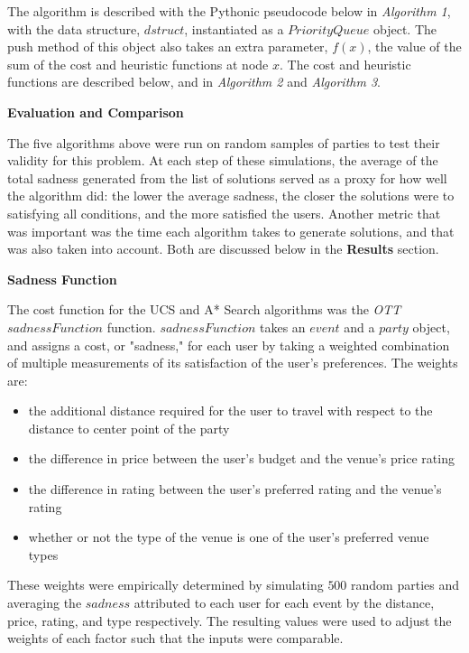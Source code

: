 \documentclass[11pt]{article}
\begin{document}
The algorithm is described with the Pythonic pseudocode below in \emph{Algorithm 1}, with the data structure, $dstruct$, instantiated as a $PriorityQueue$ object. The push method of this object also takes an extra parameter, $f(x)$, the value of the sum of the cost and heuristic functions at node $x$. The cost and heuristic functions are described below, and in \emph{Algorithm 2} and \emph{Algorithm 3}.

\medskip

\textbf{Evaluation and Comparison}

The five algorithms above were run on random samples of parties to test their validity for this problem. At each step of these simulations, the average of the total sadness generated from the list of solutions served as a proxy for how well the algorithm did: the lower the average sadness, the closer the solutions were to satisfying all conditions, and the more satisfied the users. Another metric that was important was the time each algorithm takes to generate solutions, and that was also taken into account. Both are discussed below in the \textbf{Results} section.

\bigskip

\textbf{Sadness Function}

The cost function for the UCS and A* Search algorithms was the \emph{OTT} $sadnessFunction$ function. $sadnessFunction$ takes an $event$ and a $party$ object, and assigns a cost, or "sadness," for each user by taking a weighted combination of multiple measurements of its satisfaction of the user's preferences. The weights are:
\begin{itemize}
    \item the additional distance required for the user to travel with respect to the distance to center point of the party
    \item the difference in price between the user's budget and the venue's price rating
    \item the difference in rating between the user's preferred rating and the venue's rating
    \item whether or not the type of the venue is one of the user's preferred venue types
\end{itemize}

These weights were empirically determined by simulating $500$ random parties and averaging the $sadness$ attributed to each user for each event by the distance, price, rating, and type respectively. The resulting values were used to adjust the weights of each factor such that the inputs were comparable. 
\end{document}
